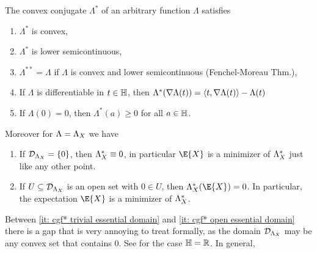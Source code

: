 \begin{lemma}
    \label{lem: properties of cgf*}
    The convex conjugate \(\Lambda^*\) of an arbitrary function \(\Lambda\)
    satisfies
    \begin{enumerate}[label=\normalfont{(\arabic*)}, noitemsep]
        \item\label{it: cgf* convex} \(\Lambda^*\) is convex,
        \item\label{it: cgf* lower semicontinuous} \(\Lambda^*\) is lower semicontinuous,
        \item\label{it: cgf* duality} \(\Lambda^{**} = \Lambda\) if \(\Lambda\) is convex and lower semicontinuous (Fenchel-Moreau Thm.),
        \item\label{it: cgf* gradient} If \(\Lambda\) is
        differentiable in \(t\in \mathbb{H}\), then \(\Lambda^*(\nabla \Lambda(t)) = \langle t, \nabla \Lambda(t)\rangle - \Lambda(t)\)
        \item\label{it: cgf* minimum at expected value} If \(\Lambda(0) = 0\), then \(\Lambda^*(a) \ge 0\) for all \(a\in \mathbb{H}\).
    \end{enumerate}
    Moreover for \(\Lambda = \Lambda_X\) we have
    \begin{enumerate}[label=\normalfont{(\arabic*)}, noitemsep, resume]
        \item\label{it: cgf* trivial essential domain} If \(\mathcal{D}_{\Lambda_X} = \{0\}\), then \(\Lambda_X^* \equiv 0\), in particular \(\E{X}\) is a minimizer of \(\Lambda_X^*\) just like any other point.
        \item\label{it: cgf* open essential domain} If \(U \subseteq \mathcal{D}_{\Lambda_X}\) is an open set with \(0\in U\), then
        \(\CGF_X^*(\E{X})=0\).
        In particular, the expectation \(\E{X}\) is a minimizer of \(\Lambda_X^*\).
    \end{enumerate}
\end{lemma}

\begin{remark}
    Between \ref{it: cgf* trivial essential domain} and \ref{it: cgf* open
    essential domain} there is a gap that is very annoying to treat formally,
    as the domain \(\mathcal{D}_{\Lambda_X}\) may be any convex set that contains \(0\). See
    \citep[Lemma~2.2.5]{demboLargeDeviationsTechniques2009} for the case
    \(\mathbb{H}=\mathbb{R}\). In general,
\end{remark}

